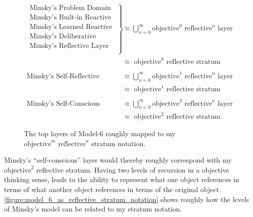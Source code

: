 \begin{figure}[bth]
  \begin{align*}
    \left.
    \begin{array}{l}
      \text{Minsky's Problem Domain }\\
      \text{Minsky's Built-in Reactive Layer }\\
      \text{Minsky's Learned Reactive Layer }\\
      \text{Minsky's Deliberative Layer }\\
      \text{Minsky's Reflective Layer }\\
    \end{array}
    \right\}                               &{\approx} \bigcup_{n=0}^{\infty}{\text{objective}^0\text{ reflective}^n\text{ layer}} \\
                                           &{\approx} \text{ objective}^0\text{ reflective stratum} \\
  \end{align*}
  \begin{align*}
    \text{Minsky's Self-Reflective Layer } &{\approx} \bigcup_{n=0}^{\infty}{\text{objective}^1\text{ reflective}^n\text{ layer}} \\
                                           &{\approx} \text{ objective}^1\text{ reflective stratum} \\
  \end{align*}
  \begin{align*}
    \text{Minsky's Self-Conscious Layer }  &{\approx} \bigcup_{n=0}^{\infty}{\text{objective}^2\text{ reflective}^n\text{ layer}} \\
                                           &{\approx} \text{ objective}^2\text{ reflective stratum}
  \end{align*}
\caption{The top layers of Model-6 roughly mapped to my
  $\text{objective}^m\text{ reflective}^n$ stratum notation.}
\label{figure:model_6_as_reflective_stratum_notation}
\end{figure}

Minsky's ``self-conscious'' layer would thereby roughly correspond
with my $\text{objective}^2$ reflective stratum.  Having two levels of
recursion in a objective thinking sense, leads to the ability to
represent what one object references in terms of what another object
references in terms of the original object.
\autoref{figure:model_6_as_reflective_stratum_notation} shows roughly
how the levels of Minsky's model can be related to my stratum
notation.

